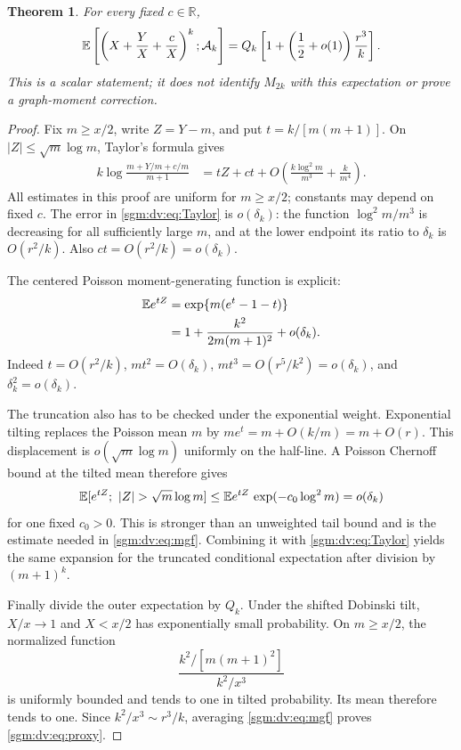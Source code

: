 \documentclass[11pt,letterpaper]{article}
\newtheorem{theorem}{Theorem}[section]
\theoremstyle{remark}\newtheorem{remark}[theorem]{Remark}
\theoremstyle{definition}\newtheorem{definition}[theorem]{Definition}
\begin{document}
\begin{theorem}\label{sgm:dv:thm:proxy}
For every fixed $c\in\mathbb R$,
\begin{equation}\label{sgm:dv:eq:proxy}
 \mathbb E\left[\left(X+\frac YX+\frac cX\right)^k;\mathcal A_k\right]
 =Q_k\left[1+\left(\frac12+o(1)\right)\frac{r^3}{k}\right].
\end{equation}
This is a scalar statement; it does not identify $M_{2k}$ with this expectation or prove a graph-moment correction.
\end{theorem}
\begin{proof}
Fix $m\ge x/2$, write $Z=Y-m$, and put $t=k/[m(m+1)]$. On $|Z|\le\sqrt m\log m$, Taylor's formula gives
\begin{align}\label{sgm:dv:eq:Taylor}
 k\log\frac{m+Y/m+c/m}{m+1}
 &=tZ+ct+O\left(\frac{k\log^2m}{m^3}+\frac{k}{m^4}\right).
\end{align}
All estimates in this proof are uniform for $m\ge x/2$; constants may depend on fixed $c$. The error in \eqref{sgm:dv:eq:Taylor} is $o(\delta_k)$: the function $\log^2m/m^3$ is decreasing for all sufficiently large $m$, and at the lower endpoint its ratio to $\delta_k$ is $O(r^2/k)$. Also $ct=O(r^2/k)=o(\delta_k)$.

The centered Poisson moment-generating function is explicit:
\begin{align}\label{sgm:dv:eq:mgf}
 \mathbb E e^{tZ}
 &=\exp\{m(e^t-1-t)\}\\
 &=1+\frac{k^2}{2m(m+1)^2}+o(\delta_k).\nonumber
\end{align}
Indeed $t=O(r^2/k)$, $mt^2=O(\delta_k)$, $mt^3=O(r^5/k^2)=o(\delta_k)$, and $\delta_k^2=o(\delta_k)$.

The truncation also has to be checked under the exponential weight. Exponential tilting replaces the Poisson mean $m$ by $me^t=m+O(k/m)=m+O(r)$. This displacement is $o(\sqrt m\log m)$ uniformly on the half-line. A Poisson Chernoff bound at the tilted mean therefore gives
\[
 \E[e^{tZ};\ |Z|>\sqrt m\log m]
 \le \E e^{tZ}\,\exp(-c_0\log^2m)=o(\delta_k)
\]
for one fixed $c_0>0$. This is stronger than an unweighted tail bound and is the estimate needed in \eqref{sgm:dv:eq:mgf}. Combining it with \eqref{sgm:dv:eq:Taylor} yields the same expansion for the truncated conditional expectation after division by $(m+1)^k$.

Finally divide the outer expectation by $Q_k$. Under the shifted Dobinski tilt, $X/x\to1$ and $X<x/2$ has exponentially small probability. On $m\ge x/2$, the normalized function
\[
 \frac{k^2/[m(m+1)^2]}{k^2/x^3}
\]
is uniformly bounded and tends to one in tilted probability. Its mean therefore tends to one. Since $k^2/x^3\sim r^3/k$, averaging \eqref{sgm:dv:eq:mgf} proves \eqref{sgm:dv:eq:proxy}.
\end{proof}
\end{document}

